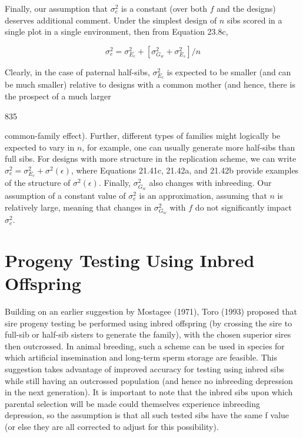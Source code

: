 \documentclass{article}
\begin{document}
Finally, our assumption that  $ \sigma_e^2 $ is a constant (over both  $ f $ and the designs) deserves additional comment. Under the simplest design of  $ n $ sibs scored in a single plot in a single environment, then from Equation 23.8c,

\begin{equation}
\sigma_{e}^{2}=\sigma_{E_{c}}^{2}+[\sigma_{G_{w}}^{2}+\sigma_{E_{s}}^{2}]/n
\end{equation}

Clearly, in the case of paternal half-sibs,  $ \sigma_{E_c}^2 $ is expected to be smaller (and can be much smaller) relative to designs with a common mother (and hence, there is the prospect of a much larger

835

common-family effect). Further, different types of families might logically be expected to vary in $n$, for example, one can usually generate more half-sibs than full sibs. For designs with more structure in the replication scheme, we can write $\sigma_e^2 = \sigma_{E_c}^2 + \sigma^2(\epsilon)$, where Equations 21.41c, 21.42a, and 21.42b provide examples of the structure of $\sigma^2(\epsilon)$. Finally, $\sigma_{G_w}^2$ also changes with inbreeding. Our assumption of a constant value of $\sigma_e^2$ is an approximation, assuming that $n$ is relatively large, meaning that changes in $\sigma_{G_w}^2$ with $f$ do not significantly impact $\sigma_e^2$.

\section{Progeny Testing Using Inbred Offspring}
Building on an earlier suggestion by Mostagee (1971), Toro (1993) proposed that sire progeny testing be performed using inbred offspring (by crossing the sire to full-sib or half-sib sisters to generate the family), with the chosen superior sires then outcrossed. In animal breeding, such a scheme can be used in species for which artificial insemination and long-term sperm storage are feasible. This suggestion takes advantage of improved accuracy for testing using inbred sibs while still having an outcrossed population (and hence no inbreeding depression in the next generation). It is important to note that the inbred sibs upon which parental selection will be made could themselves experience inbreeding depression, so the assumption is that all such tested sibs have the same f value (or else they are all corrected to adjust for this possibility).
\end{document}
